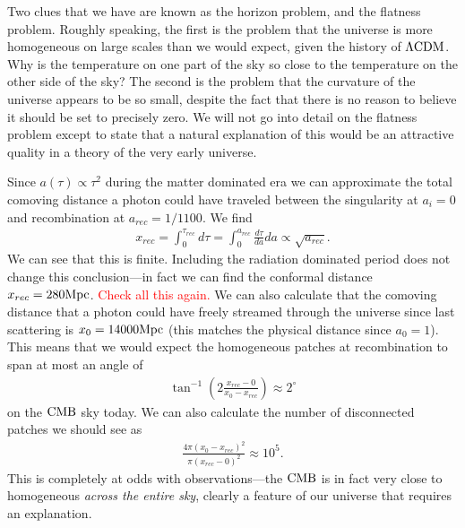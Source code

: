     Two clues that we have are known as the horizon problem, and the flatness problem.
    Roughly speaking, the first is the problem that the universe is more homogeneous on
    large scales than we would expect, given the history of $\Lambda\text{CDM}$. Why is the temperature on one
    part of the sky so close to the temperature on the other side of the sky?
    The second is the problem that the curvature of the universe appears to be so
    small, despite the fact that there is no reason to believe it should be set to precisely zero.
    We will not go into detail on the flatness problem except to state that
    a natural explanation of this would be an attractive quality in a
    theory of the very early universe.


    Since $a(\tau)\propto \tau^2$ during the matter dominated era we can approximate
    the total comoving distance a photon could have traveled between the singularity at $a_i=0$
    and recombination at $a_{rec}=1/1100$. We find
    \begin{align}
        x_{rec} = \int_{0}^{\tau_{rec}} d \tau = \int_{0}^{a_{rec}} \frac{d\tau}{da}da \propto \sqrt{a_{rec}}.
    \end{align}
    We can see that this is finite.
    Including the radiation dominated period does not change this conclusion---in fact
    we can find the conformal distance $x_{rec}=280\text{Mpc}$.
    \textcolor{red}{Check all this again.}
    We can also calculate that the comoving distance that a photon could have
    freely streamed through the universe since
    last scattering is $x_0=14000\text{Mpc}$ (this matches the physical distance
    since $a_0=1$).
    This means that we would expect the homogeneous patches at recombination to span
    at most an angle of
    \begin{align}
        \tan^{-1}\left(2\frac{x_{rec}-0}{x_{0}-x_{rec}}\right) \approx 2^{\circ}
    \end{align}
    on the $\text{CMB}$ sky today.
    We can also calculate the number of disconnected patches
    we should see as
    \begin{align}
        \frac{4\pi(x_{0}-x_{rec})^2}{\pi(x_{rec}-0)^2} \approx 10^5.
    \end{align}
    This is completely at odds with observations---the $\text{CMB}$ is in fact very close to
    homogeneous \textit{across the entire sky}, clearly a feature of our universe
    that requires an explanation.


